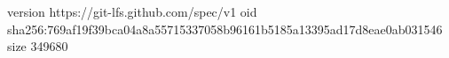 version https://git-lfs.github.com/spec/v1
oid sha256:769af19f39bca04a8a55715337058b96161b5185a13395ad17d8eae0ab031546
size 349680
